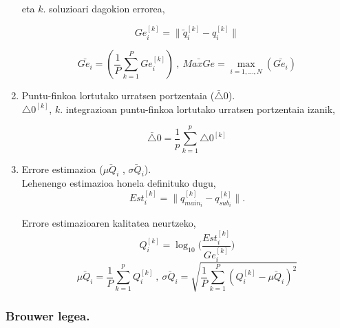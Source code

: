\begin{enumerate}
            eta $k.$ soluzioari dagokion errorea, 
            
            \begin{equation*}
            Ge^{[k]}_i=\|\tilde{q}^{[k]}_i-q^{[k]}_i\|
            \end{equation*}
            
            \begin{equation*}
            \bar{Ge_i}= (\frac{1}{P}\sum_{k=1}^{P} Ge^{[k]}_i) \ , \
                          \bar{MaxGe}=\max_{i=1,\dots,N} (\bar{Ge_i})
            \end{equation*}           
           
            \item Puntu-finkoa lortutako urratsen portzentaia ($\bar{\triangle}0$).\\
           
            $\triangle0^{[k]}$,  $k.$ integrazioan puntu-finkoa lortutako urratsen portzentaia izanik,
            
            \begin{equation*}
            \bar{\triangle}0= \frac{1}{p}\sum_{k=1}^{p}\triangle0^{[k]}
            \end{equation*}
 
            \item Errore estimazioa ($\bar{\mu Q_i}$ , $\bar{\sigma Q_i}$). \\
            
            Lehenengo estimazioa honela definituko dugu,
            \begin{equation*}
            Est^{[k]}_i=\|{q}^{[k]}_{main_i}-q^{[k]}_{sub_i}\|.
            \end{equation*}

            
            Errore estimazioaren kalitatea neurtzeko,
            \begin{equation} \label{eq:eq_Qi}
               Q_i^{[k]}=\log_{10} \bigg(\frac{Est^{[k]}_i}{Ge^{[k]}_i}\bigg)
            \end{equation}
            \[\bar{\mu Q_i}=\frac{1}{P}\sum_{k=1}^{p} Q_i^{[k]} \ , \ 
              \bar{\sigma Q_i}=\sqrt{\frac{1}{P}\sum_{k=1}^{P} (Q_i^{[k]}-\bar{\mu Q_i})^2}\]
\end{enumerate} 

\subsubsection{Brouwer legea.}

